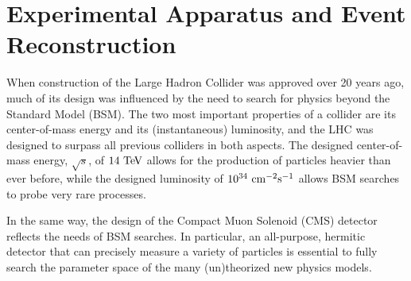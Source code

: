 \chapter{Experimental Apparatus and Event Reconstruction}

When construction of the Large Hadron Collider was approved over 20 years ago, much of its design was influenced by the need to search for physics beyond the Standard Model (BSM).
The two most important properties of a collider are its center-of-mass energy and its (instantaneous) luminosity, and the LHC was designed to surpass all previous colliders in both aspects.
The designed center-of-mass energy, $\sqrt{s}$, of $14~\mathrm{Te\kern -0.1em V}$ allows for the production of particles heavier than ever before, while the designed luminosity of $10^{34}~\mathrm{cm}^{-2}\mathrm{s}^{-1}$ allows BSM searches to probe very rare processes.

In the same way, the design of the Compact Muon Solenoid (CMS) detector reflects the needs of BSM searches.
In particular, an all-purpose, hermitic detector that can precisely measure a variety of particles is essential to fully search the parameter space of the many (un)theorized new physics models.

